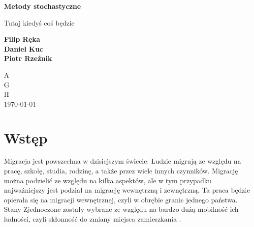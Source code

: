 \documentclass[a4paper,12pt]{article}
\begin{document}
\begin{titlepage}
    \begin{center}
        \vspace*{1cm}

        \Huge
        \textbf{Metody stochastyczne}

        \vspace{0.5cm}
        \LARGE
        Tutaj kiedyś coś będzie

        \vspace{1.5cm}

        \textbf{Filip Ręka\\ Daniel Kuc\\ Piotr Rzeźnik}

        \vfill


        \vspace{0.8cm}

        \Large
        A\\
        G\\
        H\\
        \today

    \end{center}
\end{titlepage}
\newpage
\section*{Wstęp}
Migracja jest powszechna w dzisiejszym świecie. Ludzie migrują ze względu na pracę, szkołę,
studia, rodzinę, a także przez wiele innych czynników. Migrację można podzielić ze względu na
kilka aspektów, ale w tym przypadku najważniejszy jest podział na migrację wewnętrzną i zewnętrzną.
Ta praca będzie opierała się na migracji wewnętrznej, czyli w obrębie granic jednego państwa.
Stany Zjednoczone zostały wybrane ze względu na bardzo dużą mobilność ich ludności,
czyli skłonność do zmiany miejsca zamieszkania \cite{wiki:migracja_ludnosci}.
\end{document}
